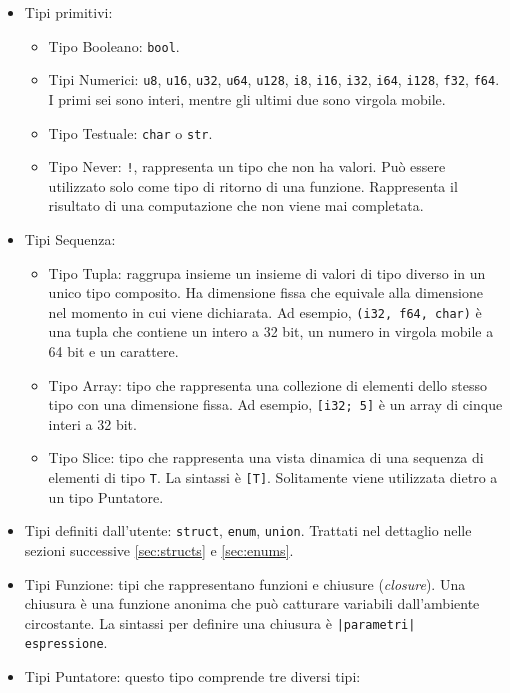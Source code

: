 \begin{itemize}
    \item Tipi primitivi:
        \begin{itemize}
            \item Tipo Booleano: \texttt{bool}.
            \item Tipi Numerici: \texttt{u8}, \texttt{u16}, \texttt{u32}, \texttt{u64}, \texttt{u128}, \texttt{i8}, \texttt{i16}, \texttt{i32}, \texttt{i64}, \texttt{i128}, \texttt{f32}, \texttt{f64}. I primi sei sono interi, mentre gli ultimi due sono virgola mobile.
            \item Tipo Testuale: \texttt{char} o \texttt{str}. 
            \item Tipo Never: \texttt{!}, rappresenta un tipo che non ha valori. Può essere utilizzato solo come tipo di ritorno di una funzione. Rappresenta il risultato di una computazione che non viene mai completata. 
        \end{itemize} 
    \item Tipi Sequenza: 
        \begin{itemize}
            \item Tipo Tupla: raggrupa insieme un insieme di valori di tipo diverso in un unico tipo composito. Ha dimensione fissa che equivale alla dimensione nel momento in cui viene dichiarata. Ad esempio, \texttt{(i32, f64, char)} è una tupla che contiene un intero a 32 bit, un numero in virgola mobile a 64 bit e un carattere.
            \item Tipo Array: tipo che rappresenta una collezione di elementi dello stesso tipo con una dimensione fissa. Ad esempio, \texttt{[i32; 5]} è un array di cinque interi a 32 bit.
            \item Tipo Slice: tipo che rappresenta una vista dinamica di una sequenza di elementi di tipo \texttt{T}. La sintassi è \texttt{[T]}. Solitamente viene utilizzata dietro a un tipo Puntatore.
        \end{itemize}
        \item Tipi definiti dall'utente: \texttt{struct}, \texttt{enum}, \texttt{union}. Trattati nel dettaglio nelle sezioni successive \ref{sec:structs} e \ref{sec:enums}.
        \item Tipi Funzione: tipi che rappresentano funzioni e chiusure (\textit{closure}). Una chiusura è una funzione anonima che può catturare variabili dall'ambiente circostante. La sintassi per definire una chiusura è \texttt{|parametri| espressione}.
        \item Tipi Puntatore: questo tipo comprende tre diversi tipi:

\end{itemize}
